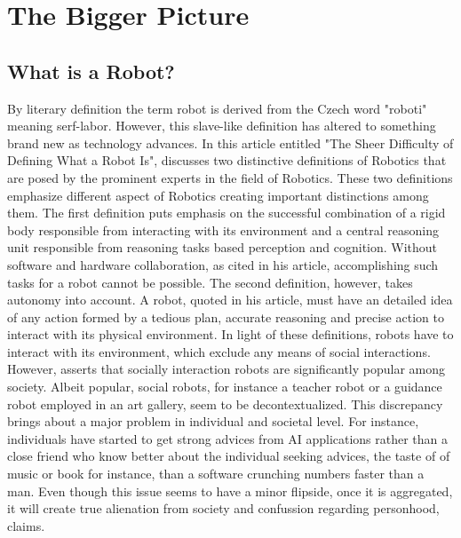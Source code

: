 \documentclass[man]{apa6}
\begin{document}
\section{The Bigger Picture}
\subsection{What is a Robot?}
By literary definition the term robot is derived from the Czech word "roboti" meaning serf-labor. However, this slave-like definition has altered to something brand new as technology advances. In this article entitled "The Sheer Difficulty of Defining What a Robot Is",  discusses two distinctive definitions of Robotics that are posed by the prominent experts in the field of Robotics. These two definitions emphasize different aspect of Robotics creating important distinctions among them. The first definition puts emphasis on the successful combination of a rigid body responsible from interacting with its environment and a central reasoning unit responsible from reasoning tasks based perception and cognition. Without software and hardware collaboration, as  cited in his article, accomplishing such tasks for a robot cannot be possible.
The second definition, however, takes autonomy into account. A robot,  quoted in his article, must have an detailed idea of any action formed by a tedious plan, accurate reasoning and precise action to interact with its physical environment. In light of these definitions, robots have to interact with its environment, which exclude any means of social interactions. However,  asserts that socially interaction robots are significantly popular among society. Albeit popular, social robots, for instance a teacher robot or a guidance robot employed in an art gallery, seem to be decontextualized. This discrepancy brings about a major problem in individual and societal level. For instance, individuals have started to get strong advices from AI applications rather than a close friend who know better about the individual seeking advices, the taste of of music or book for instance, than a software crunching numbers faster than a man. Even though this issue seems to have a minor flipside, once it is aggregated, it will create true alienation from society and confussion regarding personhood,  claims.\par
\end{document}
